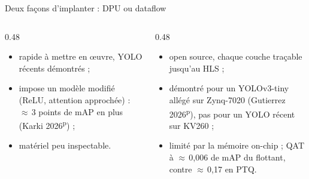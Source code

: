 \documentclass[aspectratio=169,11pt]{beamer}
\newcommand{\pre}{\textsuperscript{\color{acc}p}}
\begin{document}
\begin{frame}{Deux façons d'implanter : DPU ou dataflow}
  \centering

  \vspace{0.5em}
  \scriptsize
  \begin{columns}[T]
    \begin{column}{0.48\textwidth}
      \begin{itemize}
        \item rapide à mettre en œuvre, YOLO récents démontrés ;
        \item impose un modèle modifié (ReLU, attention approchée) : $\approx$\,3 points de
              mAP en plus (Karki 2026\pre) ;
        \item matériel peu inspectable.
      \end{itemize}
    \end{column}
    \begin{column}{0.48\textwidth}
      \begin{itemize}
        \item open source, chaque couche traçable jusqu'au HLS ;
        \item démontré pour un YOLOv3-tiny allégé sur Zynq-7020 (Gutierrez 2026\pre),
              pas pour un YOLO récent sur KV260 ;
        \item limité par la mémoire on-chip ; QAT à $\approx$\,0,006 de mAP du flottant,
              contre $\approx$\,0,17 en PTQ.
      \end{itemize}
    \end{column}
  \end{columns}
\end{frame}
\end{document}
